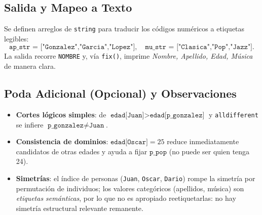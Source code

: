 \subsection*{Salida y Mapeo a Texto}
Se definen arreglos de \texttt{string} para traducir los códigos numéricos a etiquetas legibles:
\[
\texttt{ap\_str = ["Gonzalez","Garcia","Lopez"]},\quad
\texttt{mu\_str = ["Clasica","Pop","Jazz"]}.
\]
La salida recorre \texttt{NOMBRE} y, vía \texttt{fix()}, imprime \emph{Nombre, Apellido, Edad, Música} de manera clara.

\subsection*{Poda Adicional (Opcional) y Observaciones}
\begin{itemize}
  \item \textbf{Cortes lógicos simples}: de \(\texttt{edad[Juan]} > \texttt{edad[p\_gonzalez]}\) y \texttt{alldifferent} se infiere \(\texttt{p\_gonzalez} \neq \texttt{Juan}\).
  \item \textbf{Consistencia de dominios}: \(\texttt{edad[Oscar]}=25\) reduce inmediatamente candidatos de otras edades y ayuda a fijar \(\texttt{p\_pop}\) (no puede ser quien tenga 24).
  \item \textbf{Simetrías}: el índice de personas (\texttt{Juan}, \texttt{Oscar}, \texttt{Dario}) rompe la simetría por permutación de individuos; los valores categóricos (apellidos, música) son \emph{etiquetas semánticas}, por lo que no es apropiado reetiquetarlas: no hay simetría estructural relevante remanente.
\end{itemize}